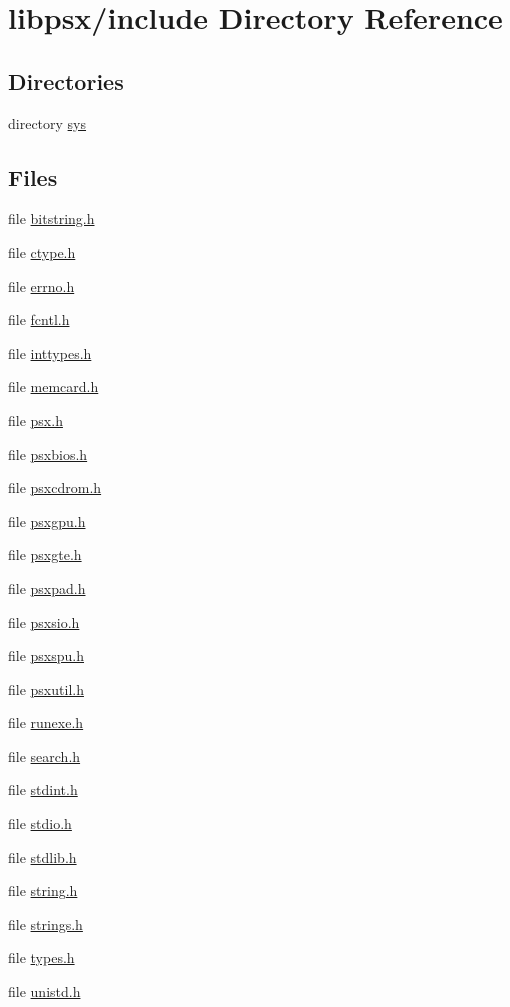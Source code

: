 \hypertarget{dir_000009}{}\section{libpsx/include Directory Reference}
\label{dir_000009}
\subsection*{Directories}
\begin{DoxyCompactItemize}
\item 
directory \hyperlink{dir_000010}{sys}
\end{DoxyCompactItemize}
\subsection*{Files}
\begin{DoxyCompactItemize}
\item 
file \hyperlink{bitstring_8h}{bitstring.\+h}
\item 
file \hyperlink{ctype_8h}{ctype.\+h}
\item 
file \hyperlink{errno_8h}{errno.\+h}
\item 
file \hyperlink{fcntl_8h}{fcntl.\+h}
\item 
file \hyperlink{inttypes_8h}{inttypes.\+h}
\item 
file \hyperlink{memcard_8h}{memcard.\+h}
\item 
file \hyperlink{psx_8h}{psx.\+h}
\item 
file \hyperlink{psxbios_8h}{psxbios.\+h}
\item 
file \hyperlink{psxcdrom_8h}{psxcdrom.\+h}
\item 
file \hyperlink{psxgpu_8h}{psxgpu.\+h}
\item 
file \hyperlink{psxgte_8h}{psxgte.\+h}
\item 
file \hyperlink{psxpad_8h}{psxpad.\+h}
\item 
file \hyperlink{psxsio_8h}{psxsio.\+h}
\item 
file \hyperlink{psxspu_8h}{psxspu.\+h}
\item 
file \hyperlink{psxutil_8h}{psxutil.\+h}
\item 
file \hyperlink{runexe_8h}{runexe.\+h}
\item 
file \hyperlink{search_8h}{search.\+h}
\item 
file \hyperlink{stdint_8h}{stdint.\+h}
\item 
file \hyperlink{stdio_8h}{stdio.\+h}
\item 
file \hyperlink{stdlib_8h}{stdlib.\+h}
\item 
file \hyperlink{string_8h}{string.\+h}
\item 
file \hyperlink{strings_8h}{strings.\+h}
\item 
file \hyperlink{types_8h}{types.\+h}
\item 
file \hyperlink{unistd_8h}{unistd.\+h}
\end{DoxyCompactItemize}

